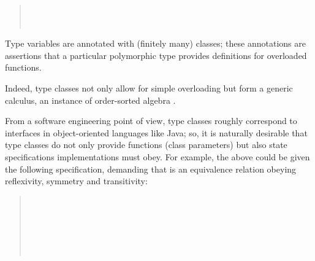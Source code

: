 \begin{isabellebody}
\begin{isamarkuptext}
\begin{quote}
  \medskip\noindent{} \\
  \hspace*{2ex} \\
  \hspace*{2ex}

  \end{quote}

  \noindent Type variables are annotated with (finitely many) classes;
  these annotations are assertions that a particular polymorphic type
  provides definitions for overloaded functions.

  Indeed, type classes not only allow for simple overloading but form
  a generic calculus, an instance of order-sorted algebra
  \cite{nipkow-sorts93,Nipkow-Prehofer:1993,Wenzel:1997:TPHOL}.

  From a software engineering point of view, type classes roughly
  correspond to interfaces in object-oriented languages like Java; so,
  it is naturally desirable that type classes do not only provide
  functions (class parameters) but also state specifications
  implementations must obey.  For example, the 
  above could be given the following specification, demanding that
   is an equivalence relation obeying reflexivity,
  symmetry and transitivity:

  \begin{quote}

  \noindent{} \\
  \hspace*{2ex} \\
   \\
  \hspace*{2ex} \\
  \hspace*{2ex} \\
  \hspace*{2ex}

  \end{quote}


\end{isamarkuptext}
\end{isabellebody}
